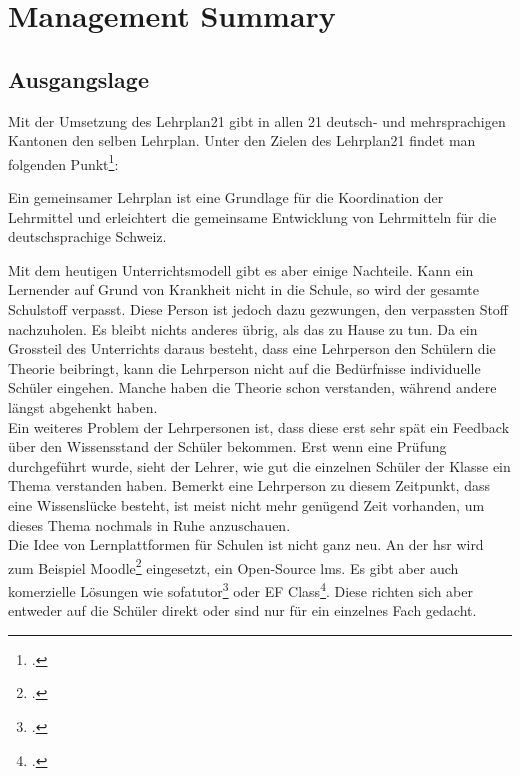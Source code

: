 \section{Management Summary}

\subsection{Ausgangslage}
Mit der Umsetzung des Lehrplan21 gibt in allen 21 deutsch- und mehrsprachigen Kantonen den selben Lehrplan. Unter den Zielen des Lehrplan21 findet man folgenden Punkt\footcite{lp21_ziel}:

\begin{displayquote}
Ein gemeinsamer Lehrplan ist eine Grundlage für die Koordination der Lehrmittel und erleichtert die gemeinsame Entwicklung von Lehrmitteln für die deutschsprachige Schweiz.
\end{displayquote}

Mit dem heutigen Unterrichtsmodell gibt es aber einige Nachteile. Kann ein Lernender auf Grund von Krankheit nicht in die Schule, so wird der gesamte Schulstoff verpasst. Diese Person ist jedoch dazu gezwungen, den verpassten Stoff nachzuholen. Es bleibt nichts anderes übrig, als das zu Hause zu tun. Da ein Grossteil des Unterrichts daraus besteht, dass eine Lehrperson den Schülern die Theorie beibringt, kann die Lehrperson nicht auf die Bedürfnisse individuelle Schüler eingehen. Manche haben die Theorie schon verstanden, während andere längst abgehenkt haben. \\

Ein weiteres Problem der Lehrpersonen ist, dass diese erst sehr spät ein Feedback über den Wissensstand der Schüler bekommen. Erst wenn eine Prüfung durchgeführt wurde, sieht der Lehrer, wie gut die einzelnen Schüler der Klasse ein Thema verstanden haben. Bemerkt eine Lehrperson zu diesem Zeitpunkt, dass eine Wissenslücke besteht, ist meist nicht mehr genügend Zeit vorhanden, um dieses Thema nochmals in Ruhe anzuschauen. \\


Die Idee von Lernplattformen für Schulen ist nicht ganz neu. An der \gls{hsr} wird zum Beispiel Moodle\footcite{moodle_homepage} eingesetzt, ein Open-Source \gls{lms}. Es gibt aber auch komerzielle Lösungen wie sofatutor\footcite{sofatutor_homepage} oder EF Class\footcite{ef_class_homepage}. Diese richten sich aber entweder auf die Schüler direkt oder sind nur für ein einzelnes Fach gedacht. \\

